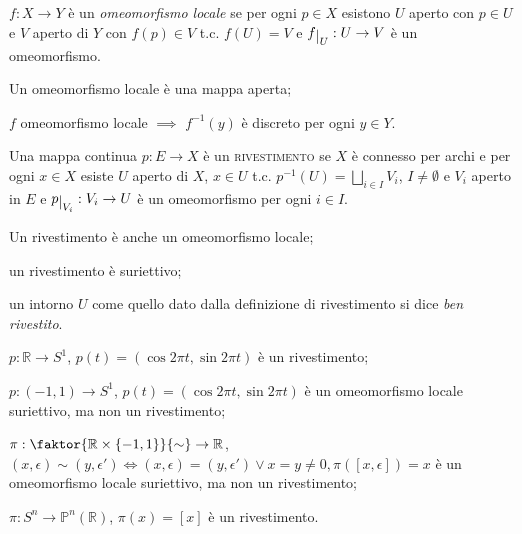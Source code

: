 \begin{defn}
  $f:X \rightarrow Y$ è un \textit{omeomorfismo locale} se per ogni $p \in X$ esistono $U$ aperto con $p \in U$ e $V$ aperto di $Y$ con $f(p) \in V$ t.c. $f(U)=V$ e $f \restrict{U}:U \rightarrow V$ è un omeomorfismo.
\end{defn}

\begin{ftt}
  \begin{nlist}
    \item Un omeomorfismo locale è una mappa aperta;
    \item $f$ omeomorfismo locale $\implies$ $f^{-1}(y)$ è discreto per ogni $y \in Y$.
  \end{nlist}
\end{ftt}

\begin{defn}
  Una mappa continua $p:E \rightarrow X$ è un \textsc{rivestimento} se $X$ è connesso per archi e per ogni $x \in X$ esiste $U$ aperto di $X$, $x \in U$ t.c. $\displaystyle p^{-1}(U)=\bigsqcup_{i \in I} V_i$, $I \not=\emptyset$ e $V_i$ aperto in $E$ e $p \restrict{V_i}:V_i \rightarrow U$ è un omeomorfismo per ogni $i \in I$.
\end{defn}

\begin{ftt}
  \begin{nlist}
    \item Un rivestimento è anche un omeomorfismo locale;
    \item un rivestimento è suriettivo;
    \item un intorno $U$ come quello dato dalla definizione di rivestimento si dice \textit{ben rivestito}.
  \end{nlist}
\end{ftt}

\begin{ex}
  \begin{nlist}
    \item $p: \mathbb{R} \rightarrow S^1$, $p(t)=(\cos{2\pi t}, \sin{2\pi t})$ è un rivestimento;
    \item $p: (-1, 1) \rightarrow S^1$, $p(t)=(\cos{2\pi t}, \sin{2\pi t})$ è un omeomorfismo locale suriettivo, ma non un rivestimento;
    \item $\pi: \faktor{ \mathbb{R} \times \{ -1, 1 \} }{\sim} \rightarrow \mathbb{R}$, $(x, \epsilon) \sim (y, \epsilon') \Leftrightarrow (x, \epsilon)=(y, \epsilon') \lor x=y \not=0, \pi([x, \epsilon])=x$ è un omeomorfismo locale suriettivo, ma non un rivestimento;
    \item $\pi: S^n \rightarrow \mathbb{P}^n(\mathbb{R})$, $\pi(x)=[x]$ è un rivestimento.\
  \end{nlist}
\end{ex}

